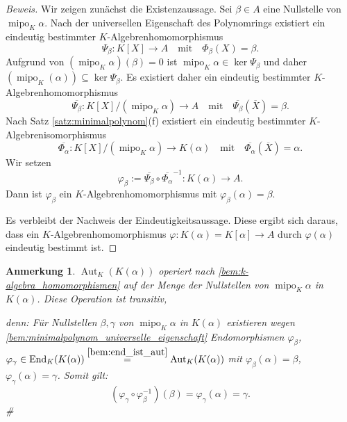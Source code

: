 \documentclass[a4paper, twoside, 11pt, ngerman]{report}
\DeclareMathOperator{\Aut}{Aut}
\DeclareMathOperator{\End}{End}
\DeclareMathOperator{\mipo}{mipo}
\theoremstyle{definistyle}
\newtheorem{anm}[satz]{Anmerkung}
\theoremstyle{remark}
\newenvironment{denn}%
  {\par\textit{denn:}}%
  {\hfill\#\par}
\begin{document}
\begin{proof}[Beweis]
Wir zeigen zunächst die Existenzaussage. Sei $\beta \in A$ eine Nullstelle von $\mipo_K \alpha$. Nach der universellen Eigenschaft des Polynomrings existiert ein eindeutig bestimmter $K$-Algebrenhomomorphismus
\[
\Psi_\beta \colon K[X] \to A \quad \text{mit} \quad \Phi_\beta(X) = \beta.
\]
Aufgrund von $(\mipo_K\alpha)(\beta) = 0$ ist $\mipo_K \alpha \in \ker \Psi_\beta$ und daher
$(\mipo_K(\alpha))\subseteq\ker\Psi_\beta$. Es existiert daher ein eindeutig bestimmter $K$-Algebrenhomomorphismus
\[
\overline{\Psi_\beta} \colon K[X]/(\mipo_K \alpha) \to A \quad \text{mit} \quad \overline{\Psi_\beta}(\overline{X}) = \beta.
\]
Nach Satz \ref{satz:minimalpolynom}(f) existiert ein eindeutig bestimmter $K$-Algebrenisomorphismus
\[
\overline{\Phi_\alpha} \colon K[X]/(\mipo_K \alpha) \to K(\alpha) \quad \text{mit} \quad \overline{\Phi_\alpha}(\overline{X}) = \alpha.
\]
Wir setzen
\[\varphi_\beta := \overline{\Psi_\beta} \circ \overline{\Phi_\alpha}^{-1} \colon K(\alpha) \to A.\]
Dann ist $\varphi_\beta$ ein $K$-Algebrenhomomorphismus mit $\varphi_\beta(\alpha) = \beta$.

Es verbleibt der Nachweis der Eindeutigkeitsaussage. Diese ergibt sich daraus, dass ein $K$-Algebrenhomomorphismus $\varphi \colon K(\alpha) = K[\alpha] \to A$ durch $\varphi(\alpha)$ eindeutig bestimmt ist.
\end{proof}

\begin{anm}\label{anm:automorphismen_operation}
$\Aut_K(K(\alpha))$ operiert nach \ref{bem:k-algebra_homomorphismen} auf der Menge der Nullstellen von $\mipo_K \alpha$ in $K(\alpha)$. Diese Operation ist transitiv,
\begin{denn}
Für Nullstellen $\beta, \gamma$ von $\mipo_K \alpha$ in $K(\alpha)$ existieren
wegen \ref{bem:minimalpolynom_universelle_eigenschaft} Endomorphismen $\varphi_\beta$, $\varphi_\gamma \in \End_K(K(\alpha)) \overset{\ref{bem:end_ist_aut}}{=} \Aut_K(K(\alpha))$ mit $\varphi_\beta(\alpha) = \beta$, $\varphi_\gamma(\alpha) = \gamma$. Somit gilt:
\[
(\varphi_\gamma \circ \varphi_\beta^{-1})(\beta) = \varphi_\gamma(\alpha) = \gamma.
\]
\end{denn}
\end{anm}
\end{document}
